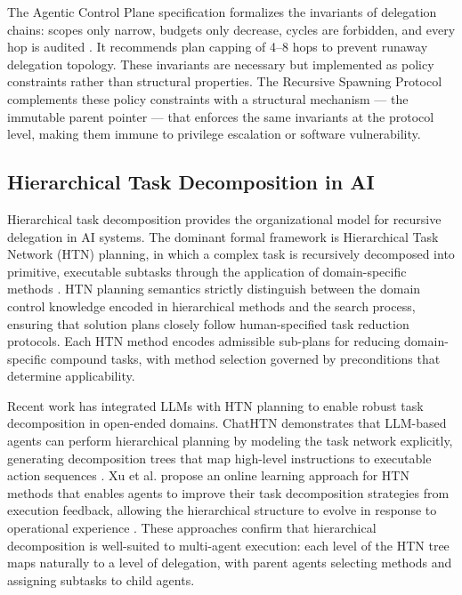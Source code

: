 The Agentic Control Plane specification formalizes the invariants of delegation chains: scopes only narrow, budgets only decrease, cycles are forbidden, and every hop is audited \cite{agenticcontrolplane2026}. It recommends plan capping of 4–8 hops to prevent runaway delegation topology. These invariants are necessary but implemented as policy constraints rather than structural properties. The Recursive Spawning Protocol complements these policy constraints with a structural mechanism — the immutable parent pointer — that enforces the same invariants at the protocol level, making them immune to privilege escalation or software vulnerability.

\subsection{Hierarchical Task Decomposition in AI}
\label{sec:htn}

Hierarchical task decomposition provides the organizational model for recursive delegation in AI systems. The dominant formal framework is Hierarchical Task Network (HTN) planning, in which a complex task is recursively decomposed into primitive, executable subtasks through the application of domain-specific methods \cite{htn2025,emergetmindhtn2025}. HTN planning semantics strictly distinguish between the domain control knowledge encoded in hierarchical methods and the search process, ensuring that solution plans closely follow human-specified task reduction protocols. Each HTN method encodes admissible sub-plans for reducing domain-specific compound tasks, with method selection governed by preconditions that determine applicability.

Recent work has integrated LLMs with HTN planning to enable robust task decomposition in open-ended domains. ChatHTN demonstrates that LLM-based agents can perform hierarchical planning by modeling the task network explicitly, generating decomposition trees that map high-level instructions to executable action sequences \cite{chathtn2025}. Xu et al. propose an online learning approach for HTN methods that enables agents to improve their task decomposition strategies from execution feedback, allowing the hierarchical structure to evolve in response to operational experience \cite{xu2025htn}. These approaches confirm that hierarchical decomposition is well-suited to multi-agent execution: each level of the HTN tree maps naturally to a level of delegation, with parent agents selecting methods and assigning subtasks to child agents.

